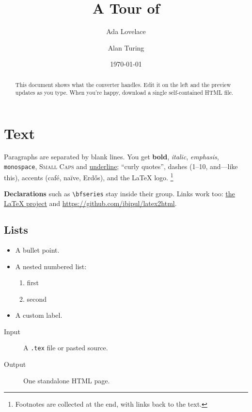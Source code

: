 \documentclass[11pt]{article}
\title{A Tour of \tool}
\author{Ada Lovelace \and Alan Turing}
\date{\today}
\theoremstyle{definition}
\begin{document}
\maketitle

\begin{abstract}
This document shows what the converter handles. Edit it on the left and the
preview updates as you type. When you're happy, download a single
self-contained HTML file.
\end{abstract}

\tableofcontents

\section{Text}
Paragraphs are separated by blank lines. You get \textbf{bold}, \textit{italic},
\emph{emphasis}, \texttt{monospace}, \textsc{Small Caps} and \underline{underline};
``curly quotes'', dashes (1--10, and---like this), accents (caf\'e, na\"ive,
Erd\H{o}s), and the \LaTeX{} logo.%
\footnote{Footnotes are collected at the end, with links back to the text.}

{\bfseries Declarations} such as \verb|\bfseries| stay inside their group.
Links work too: \href{https://www.latex-project.org}{the \LaTeX{} project}
and \url{https://github.com/ibipul/latex2html}.

\subsection{Lists}
\begin{itemize}
  \item A bullet point.
  \item A nested numbered list:
  \begin{enumerate}
    \item first \label{item:first}
    \item second
  \end{enumerate}
  \item[$\star$] A custom label.
\end{itemize}

\begin{description}
  \item[Input] A \texttt{.tex} file or pasted source.
  \item[Output] One standalone HTML page.
\end{description}
\end{document}
